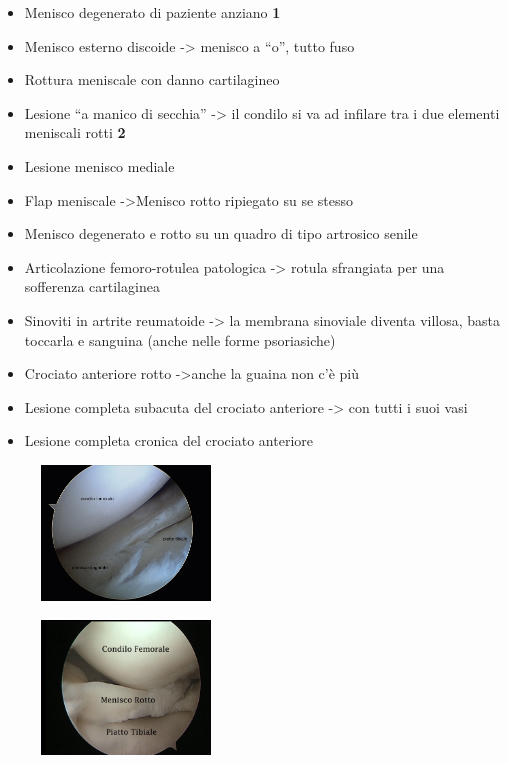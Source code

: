 \begin{itemize}
\item
  Menisco degenerato di paziente anziano \textbf{1}
\item
  Menisco esterno discoide -> menisco a ``o'', tutto fuso
\item
  Rottura meniscale con danno cartilagineo
\item
  Lesione ``a manico di secchia'' -> il condilo si va ad infilare tra i due elementi meniscali rotti \textbf{2}
\item
  Lesione menisco mediale
\item
  Flap meniscale ->Menisco rotto ripiegato su se stesso
\item
  Menisco degenerato e rotto su un quadro di tipo artrosico senile
\item
  Articolazione femoro-rotulea patologica -> rotula sfrangiata per una sofferenza cartilaginea
\item
  Sinoviti in artrite reumatoide -> la membrana sinoviale diventa villosa, basta toccarla e sanguina (anche nelle forme psoriasiche)
\item
  Crociato anteriore rotto ->anche la guaina non c'è più
\item
  Lesione completa subacuta del crociato anteriore -> con tutti i suoi vasi
\item
  Lesione completa cronica del crociato anteriore
\end{itemize}

\begin{figure}[!ht]
\centering
\includegraphics[width=0.4\textwidth]{009/image19.jpeg}
\end{figure}

\begin{figure}[!ht]
\centering
\includegraphics[width=0.4\textwidth]{009/image20.jpeg}
\end{figure}



